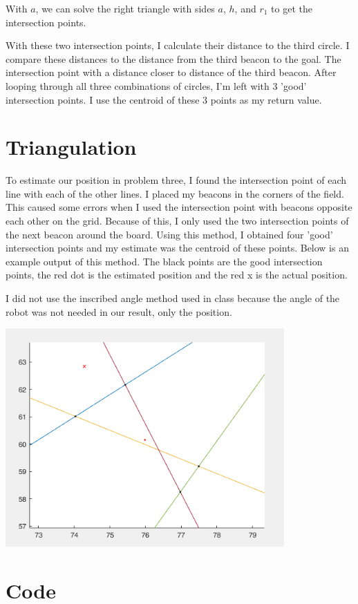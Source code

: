 \documentclass[12pt]{article}
\begin{document}
	\noindent With $a$, we can solve the right triangle with sides $a$, $h$, and $r_1$ to get the intersection points.
	
	With these two intersection points, I calculate their distance to the third circle. I compare these distances to the distance from the third beacon to the goal. The intersection point with a distance closer to distance of the third beacon. After looping through all three combinations of circles, I'm left with 3 'good' intersection points. I use the centroid of these 3 points as my return value.
	
	\section{Triangulation}

	To estimate our position in problem three, I found the intersection point of each line with each of the other lines. I placed my beacons in the corners of the field. This caused some errors when I used the intersection point with beacons opposite each other on the grid. Because of this, I only used the two intersection points of the next beacon around the board. Using this method, I obtained four 'good' intersection points and my estimate was the centroid of these points. Below is an example output of this method. The black points are the good intersection points, the red dot is the estimated position and the red x is the actual position.
	
	I did not use the inscribed angle method used in class because the angle of the robot was not needed in our result, only the position.	
	\begin{center}\includegraphics[width=0.8\textwidth]{p3ex}\end{center}
	
	\pagebreak
	
	\section{Code}
	
	
	
	\pagebreak
	
	
	
	\pagebreak
	
	
\end{document}
